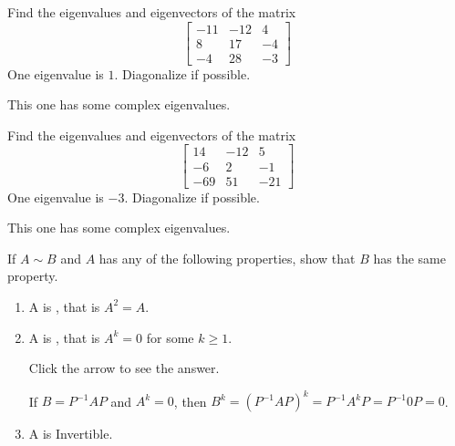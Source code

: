 \documentclass{ximera}
\begin{document}
\begin{problem}\label{prb:8.30} Find the eigenvalues and eigenvectors of the matrix
\begin{equation*}
\left[
\begin{array}{rrr}
-11 & -12 & 4 \\
8 & 17 & -4 \\
-4 & 28 & -3
\end{array}
\right]
\end{equation*}
One eigenvalue is $1.$ Diagonalize if possible.  
\begin{hint}
This one has some complex eigenvalues.
\end{hint}
\end{problem}

\begin{problem}\label{prb:8.31} Find the eigenvalues and eigenvectors of the matrix
\begin{equation*}
\left[
\begin{array}{rrr}
14 & -12 & 5 \\
-6 & 2 & -1 \\
-69 & 51 & -21
\end{array}
\right]
\end{equation*}
One eigenvalue is $-3.$ Diagonalize if possible.  
\begin{hint}
This one has some complex eigenvalues.
\end{hint}
\end{problem}

\begin{problem}\label{prob:moresimilarproperties}
If $A \sim B$ and $A$ has any of the following properties, show that $B$ has the same property.

\begin{enumerate}
\item\label{prob:moresimilarproperties_idempotent} A is , that is $A^{2} = A$.

\item\label{prob:moresimilarproperties_nilpotent} A is , that is $A^{k} = 0$ for some $k \geq 1$.

Click the arrow to see the answer.
\begin{expandable}
If $B = P^{-1}AP$ and $A^{k} = 0$, then $B^{k} = (P^{-1}AP)^{k} = P^{-1}A^{k}P = P^{-1}0P = 0$.
\end{expandable}

\item\label{prob:moresimilarproperties_invertible} A is Invertible.

\end{enumerate}

\end{problem}
\end{document}
